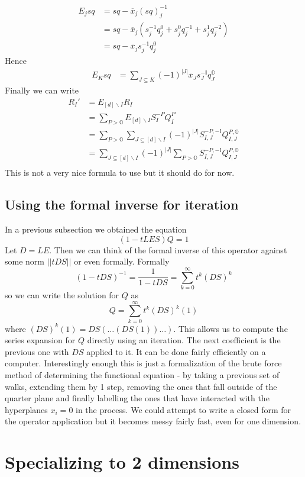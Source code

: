 \documentclass[12pt]{article}
\newcommand{\oo}{\mathbb{O}}
\newcommand{\one}{\mathbb{I}}
\theoremstyle{definition} \newtheorem{definition}[theorem]{Definition}
\newcommand{\ol}[1]{\overline{#1}}
\begin{document}
\begin{align*}
	E_j sq &= sq - \ol{x}_j(sq)_j^{-1} \\ 
	&= sq - \ol{x}_j(s_j^{-1}q_j^0+s_j^{0}q_j^{-1}+s_j^{1}q_j^{-2})\\
	& = sq - \ol{x}_js_j^{-1}q_j^0
\end{align*}
Hence
\begin{align*}
	E_{K} sq &= \sum_{J\subseteq K} (-1)^{|J|}\ol{x}_J s_J^{-\one} q_J^\oo
\end{align*}
Finally we can write
\begin{align*}
	R_I' &= E_{[d]\backslash I} R_I \\
	& = \sum_{P > \oo} E_{[d]\backslash I}S_I^{-P}Q_I^P\\
	& = \sum_{P > \oo} \sum_{J \subseteq [d]\backslash I} (-1)^{|J|} S_{I,J}^{-P,-\one}Q_{I,J}^{P,\oo}\\
	& = \sum_{J \subseteq [d]\backslash I}(-1)^{|J|}\sum_{P > \oo} S_{I,J}^{-P,-\one}Q_{I,J}^{P,\oo}\\
\end{align*}
This is not a very nice formula to use but it should do for now.
\subsection{Using the formal inverse for iteration}
In a previous subsection we obtained the equation
\[
	(1-tLES)Q = 1
\]
Let $D = LE$. Then we can think of the formal inverse of this operator against some norm $||tDS||$ or even formally. Formally
\[
	(1-tDS)^{-1} = \frac{1}{1-tDS} = \sum_{k=0}^{\infty}t^k(DS)^k
\]
so we can write the solution for $Q$ as
\[
Q = \sum_{k=0}^{\infty}t^k (DS)^k(1)
\]
where $(DS)^k(1) = DS(\ldots (DS(1))\ldots)$. This allows us to compute the series expansion for $Q$ directly using an iteration. The next coefficient is the previous one with $DS$ applied to it. It can be done fairly efficiently on a computer. Interestingly enough this is just a formalization of the brute force method of determining the functional equation - by taking a previous set of walks, extending them by 1 step, removing the ones that fall outside of the quarter plane and finally labelling the ones that have interacted with the hyperplanes $x_i = 0$ in the process. We could attempt to write a closed form for the operator application but it becomes messy fairly fast, even for one dimension.
\section{Specializing to 2 dimensions}
\end{document}
